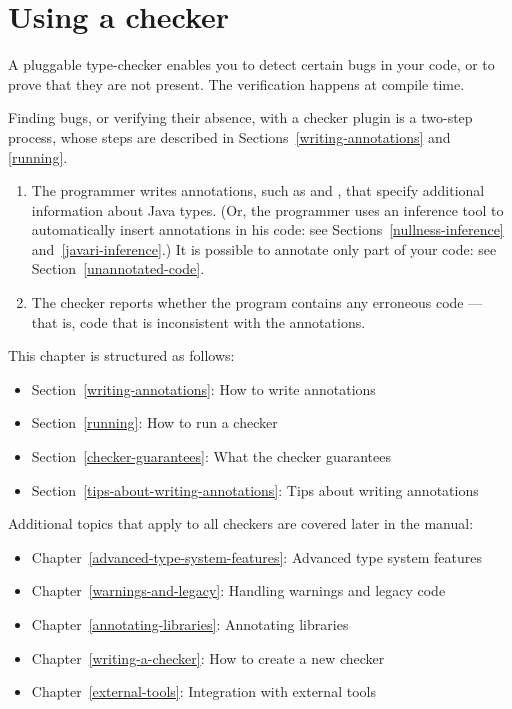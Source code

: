 \htmlhr
\chapter{Using a checker\label{using-a-checker}}

A pluggable type-checker enables you to detect certain bugs in your code,
or to prove that they are not present.  The verification happens at compile
time.


Finding bugs, or verifying their absence, with a checker plugin is a two-step process, whose steps are
described in Sections~\ref{writing-annotations} and \ref{running}.

\begin{enumerate}

\item The programmer writes annotations, such as  and
  , that specify additional information about Java types.
  (Or, the programmer uses an inference tool to automatically insert
  annotations in his code:  see Sections~\ref{nullness-inference} and~\ref{javari-inference}.)
  It is possible to annotate only part of your code:  see
  Section~\ref{unannotated-code}.

\item The checker reports whether the program contains any erroneous code
  --- that is, code that is inconsistent with the annotations.

\end{enumerate}

This chapter is structured as follows:
\begin{itemize}
\item Section~\ref{writing-annotations}: How to write annotations
\item Section~\ref{running}:  How to run a checker
\item Section~\ref{checker-guarantees}: What the checker guarantees
\item Section~\ref{tips-about-writing-annotations}: Tips about writing annotations
\end{itemize}

Additional topics that apply to all checkers are covered later in the manual:
\begin{itemize}
\item Chapter~\ref{advanced-type-system-features}: Advanced type system features
\item Chapter~\ref{warnings-and-legacy}: Handling warnings and legacy code
\item Chapter~\ref{annotating-libraries}: Annotating libraries
\item Chapter~\ref{writing-a-checker}: How to create a new checker
\item Chapter~\ref{external-tools}: Integration with external tools
\end{itemize}


